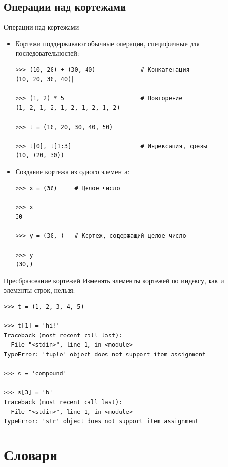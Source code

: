 \documentclass[aspectratio=169, mathserif]{beamer}%
\begin{document}
\subsection{Операции над кортежами}

\begin{frame}[fragile]{Операции над кортежами}
\scriptsize
\begin{itemize}
\item Кортежи поддерживают обычные операции, специфичные для последовательностей:
\begin{verbatim}
>>> (10, 20) + (30, 40)             # Конкатенация
(10, 20, 30, 40)|

>>> (1, 2) * 5                      # Повторение
(1, 2, 1, 2, 1, 2, 1, 2, 1, 2)  

>>> t = (10, 20, 30, 40, 50)

>>> t[0], t[1:3]                    # Индексация, срезы
(10, (20, 30))
\end{verbatim}
\item Создание кортежа из одного элемента:
\begin{verbatim}
>>> x = (30)     # Целое число

>>> x
30

>>> y = (30, )   # Кортеж, содержащий целое число

>>> y
(30,)
\end{verbatim}
\end{itemize}
\vfill
\end{frame}


\begin{frame}[fragile]{Преобразование кортежей}
\scriptsize
Изменять элементы кортежей по индексу, как и элементы строк, нельзя:

\begin{verbatim}
>>> t = (1, 2, 3, 4, 5)

>>> t[1] = 'hi!'     
Traceback (most recent call last):
  File "<stdin>", line 1, in <module>
TypeError: 'tuple' object does not support item assignment

>>> s = 'compound'

>>> s[3] = 'b'
Traceback (most recent call last):
  File "<stdin>", line 1, in <module>
TypeError: 'str' object does not support item assignment
\end{verbatim}
\vfill
\end{frame}


\section{Словари}
\sectionframe
\end{document}
